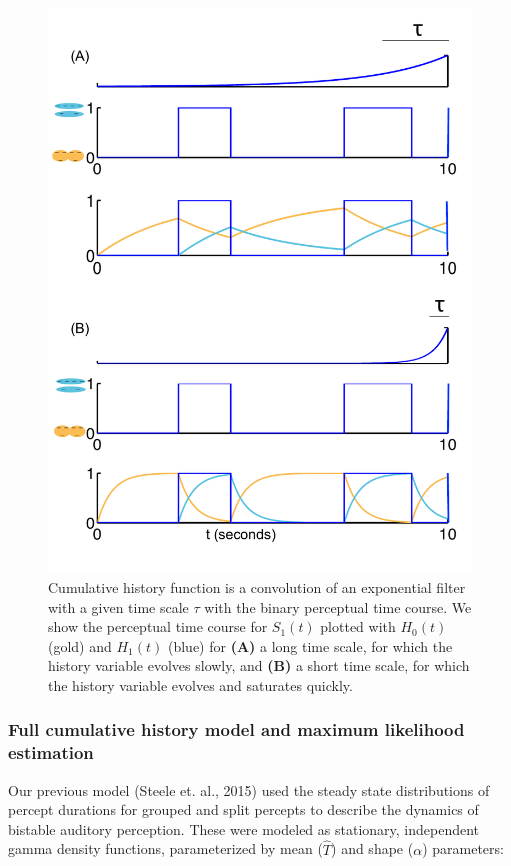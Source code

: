 \begin{figure}
	\centering
	\includegraphics[scale=0.7]{ch3Figs/cumhistPercepts_tau1.pdf}
	\caption{Cumulative history function is a convolution of an exponential filter with a given time scale $\tau$ with the binary perceptual time course. We show the perceptual time course for $S_1(t)$ plotted with $H_0(t)$ (gold) and $H_1(t)$ (blue) for \textbf{(A)} a long time scale, for which the history variable evolves slowly, and \textbf{(B)} a short time scale, for which the history variable evolves and saturates quickly.}
	\label{fig:cumhistPercepts_tau}
\end{figure}

\subsubsection{Full cumulative history model and maximum likelihood estimation}


Our previous model (Steele et. al., 2015) used the steady state distributions of percept durations for grouped and split percepts to describe the dynamics of bistable auditory perception. These were modeled as stationary, independent gamma density functions, parameterized by mean ($\hat{T}$) and shape ($\alpha$) parameters:


